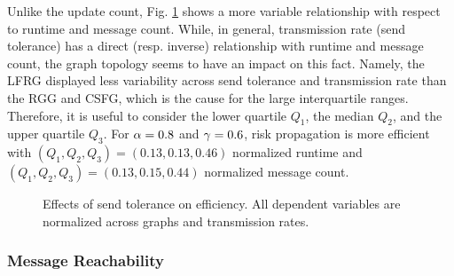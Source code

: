 Unlike the update count, Fig. \ref{fig:efficiency} shows a more variable relationship with respect to runtime and message count. While, in general, transmission rate (send tolerance) has a direct (resp. inverse) relationship with runtime and message count, the graph topology seems to have an impact on this fact. Namely, the LFRG displayed less variability across send tolerance and transmission rate than the RGG and CSFG, which is the cause for the large interquartile ranges. Therefore, it is useful to consider the lower quartile $Q_1$, the median $Q_2$, and the upper quartile $Q_3$. For $\alpha = 0.8 $ and $\gamma = 0.6$, risk propagation is more efficient with $(Q_{1}, Q_{2}, Q_{3}) = (0.13, 0.13, 0.46)$ normalized runtime and $(Q_{1}, Q_{2}, Q_{3}) = (0.13, 0.15, 0.44)$ normalized message count.
\begin{figure}[htbp]
	\centering
	\caption[Effects of send tolerance on efficiency]{Effects of send tolerance on efficiency. All dependent variables are normalized across graphs and transmission rates.}
	\label{fig:efficiency}
\end{figure}

\subsubsection{Message Reachability}

